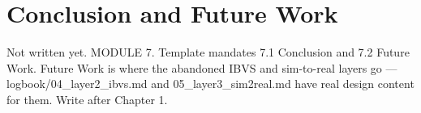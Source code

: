 \chapter{Conclusion and Future Work}\label{ch:conclusion}

\begin{draftnote}
Not written yet. MODULE 7. Template mandates 7.1 Conclusion and 7.2 Future Work. Future Work is where the abandoned IBVS and sim-to-real layers go --- logbook/04\_layer2\_ibvs.md and 05\_layer3\_sim2real.md have real design content for them. Write after Chapter 1.
\end{draftnote}
